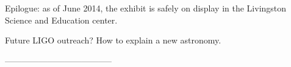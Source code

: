         Epilogue: as of June 2014, the exhibit is safely on display in the Livingston Science and Education center.

        Future LIGO outreach? How to explain a new astronomy.


        --------------------------------------




